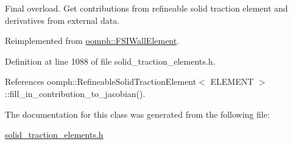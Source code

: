 Final overload. Get contributions from refineable solid traction element and derivatives from external data. 



Reimplemented from \hyperlink{classoomph_1_1FSIWallElement_a7817d2662c24540d3757cb1a1194a635}{oomph\+::\+F\+S\+I\+Wall\+Element}.



Definition at line 1088 of file solid\+\_\+traction\+\_\+elements.\+h.



References oomph\+::\+Refineable\+Solid\+Traction\+Element$<$ E\+L\+E\+M\+E\+N\+T $>$\+::fill\+\_\+in\+\_\+contribution\+\_\+to\+\_\+jacobian().



The documentation for this class was generated from the following file\+:\begin{DoxyCompactItemize}
\item 
\hyperlink{solid__traction__elements_8h}{solid\+\_\+traction\+\_\+elements.\+h}\end{DoxyCompactItemize}
